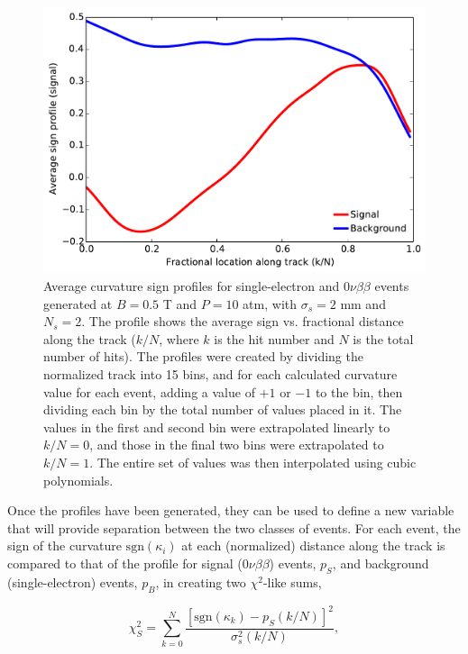 \documentclass{JINST}
\begin{document}
\begin{figure}[!htb]
	\centering
	\includegraphics[scale=0.55]{fig/sbprof_nmagse2.pdf}
	\caption{\label{fig_profiles}Average curvature sign profiles for single-electron and $0\nu\beta\beta$ events generated at $B = 0.5$ T and $P = 10$ atm, with $\sigma_{s} = 2$ mm and $N_{s} = 2$.  The profile shows the average sign vs. fractional distance along the track ($k/N$, where $k$ is the hit number and $N$ is the total number of hits).  The profiles were created by dividing the normalized track into 15 bins, and for each calculated curvature value for each event, adding a value of $+1$ or $-1$ to the bin, then dividing each bin by the total number of values placed in it.  The values in the first and second bin were extrapolated linearly to $k/N = 0$, and those in the final two bins were extrapolated to $k/N = 1$.  The entire set of values was then interpolated using cubic polynomials.}
\end{figure}

Once the profiles have been generated, they can be used to define a new variable that will provide separation between the two classes of events.  For each event, the sign of the curvature $\mathrm{sgn}(\kappa_{i})$ at each (normalized) distance along the track is compared to that of the profile for signal ($0\nu\beta\beta$) events, $p_{S}$, and background (single-electron) events, $p_{B}$, in creating two $\chi^2$-like sums,

\begin{equation}
 \chi^2_{S} = \sum_{k=0}^{N}\frac{[\mathrm{sgn}(\kappa_{k}) - p_{S}(k/N)]^{2}}{\sigma^2_{s}(k/N)},
\end{equation}
\end{document}
